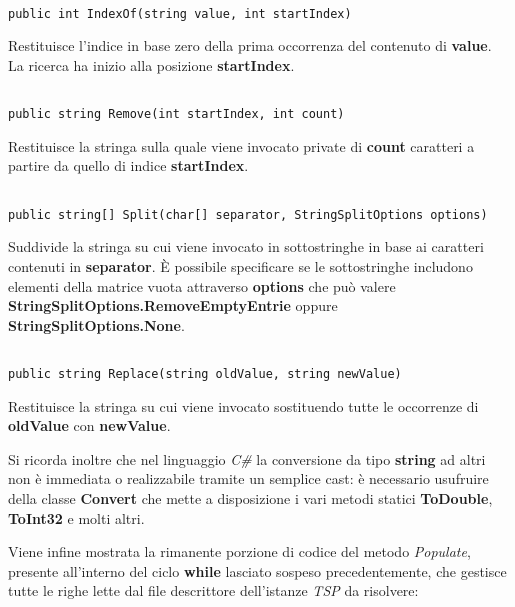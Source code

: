 \documentclass[11pt]{article}
\begin{document}
\begin{lstlisting}

public int IndexOf(string value, int startIndex)

\end{lstlisting}

Restituisce l'indice in base zero della prima occorrenza del contenuto di \textbf{value}. La ricerca ha inizio alla posizione \textbf{startIndex}.


\begin{lstlisting}

public string Remove(int startIndex, int count)

\end{lstlisting}

Restituisce la stringa sulla quale viene invocato private di \textbf{count} caratteri a partire da quello di indice \textbf{startIndex}.


\begin{lstlisting}

public string[] Split(char[] separator, StringSplitOptions options)

\end{lstlisting}

Suddivide la stringa su cui viene invocato in sottostringhe in base ai caratteri contenuti in \textbf{separator}. È possibile specificare se le sottostringhe includono elementi della matrice vuota attraverso \textbf{options} che può valere \textbf{StringSplitOptions.RemoveEmptyEntrie} oppure \textbf{StringSplitOptions.None}.


\begin{lstlisting}

public string Replace(string oldValue, string newValue)

\end{lstlisting}

Restituisce la stringa su cui viene invocato sostituendo tutte le occorrenze di \textbf{oldValue} con \textbf{newValue}.


Si ricorda inoltre che nel linguaggio \textit{C\#} la conversione da tipo \textbf{string} ad altri non è immediata o realizzabile tramite un semplice cast: è necessario usufruire della classe \textbf{Convert} che mette a disposizione i vari metodi statici \textbf{ToDouble}, \textbf{ToInt32} e molti altri.

Viene infine mostrata la rimanente porzione di codice del metodo \textit{Populate}, presente all'interno del ciclo \textbf{while} lasciato sospeso precedentemente, che gestisce tutte le righe lette dal file descrittore dell'istanze \textit{TSP} da risolvere:
\end{document}
